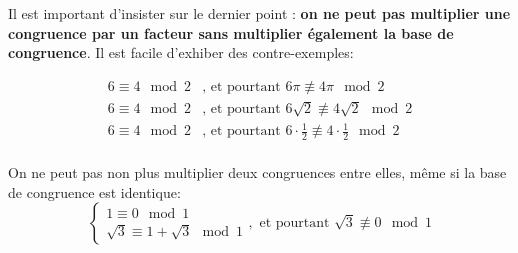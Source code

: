 \begin{attention}
Il est important d'insister sur le dernier point : \textbf{on ne peut pas multiplier une congruence par un facteur sans multiplier également la base de congruence}. Il est facile d'exhiber des contre-exemples:

\begin{align*}
6\equiv 4 \mod 2 &\text{, et pourtant } 6\pi \not\equiv 4\pi \mod 2\\
6\equiv 4 \mod 2 &\text{, et pourtant } 6\sqrt2 \not\equiv 4\sqrt2 \mod 2\\
6\equiv 4 \mod 2 &\text{, et pourtant } 6\cdot \frac12 \not\equiv 4\cdot\frac12 \mod 2\\
\end{align*}

On ne peut pas non plus multiplier deux congruences entre elles, même si la base de congruence est identique:
\[ \begin{cases} 1\equiv 0 \mod 1\\ \sqrt 3 \equiv 1+\sqrt 3 \mod 1\end{cases}, \text{ et pourtant }
\sqrt 3 \not\equiv 0 \mod 1
\]
\end{attention}

\begin{comment}
Les erreurs de compréhension sur la multiplication semblent être causées par le fait suivant:
\begin{exercice}
Soient $x$ et $y$ des réels, et $n$ un \underline{entier} (relatif). Si $x\equiv y\mod \alpha$, alors $nx\equiv ny \mod \alpha$.
\end{exercice}
Ce résultat est correct et sa preuve est facile, mais :
\begin{enumerate}
\item Il est moins précis que la proposition précédente, qui affirme $nx\equiv ny \mod n\alpha$. Pr exemple, si $x\equiv y \mod 3$, il est exact que $2x\equiv 2y \mod 3$, mais ceci est moins précis que $2x\equiv 2y \mod 6$.
\item Ce n'est pas une équivalence. Par exemple, même si $2x\equiv 2y \mod 3$, on ne peut en aucun cas en déduire que $x\equiv y \mod 3$.
\end{enumerate}
Donc même dans ce cas, il est fortement déconseillé d'utiliser cet énoncé : même dans les cas où il est correct, il fournit un outil moins fort et moins maniable que la proposition.
\end{comment}

